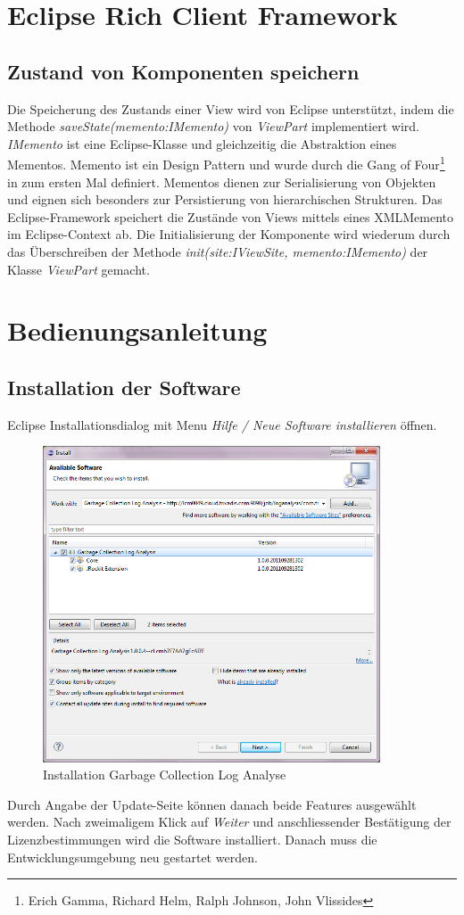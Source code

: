 \chapter{Eclipse Rich Client Framework}
\section{Zustand von Komponenten speichern}\label{memento}
Die Speicherung des Zustands einer View wird von Eclipse unterstützt, indem die Methode \textit{saveState(memento:IMemento)} von \textit{ViewPart} implementiert wird. \textit{IMemento} ist eine Eclipse-Klasse und gleichzeitig die Abstraktion eines Mementos. Memento ist ein Design Pattern und wurde durch die Gang of Four\footnote{Erich Gamma, Richard Helm, Ralph Johnson, John Vlissides} in \cite[S. 283]{gamma1995design} zum ersten Mal definiert. Mementos dienen zur Serialisierung von Objekten und eignen sich besonders zur Persistierung von hierarchischen Strukturen. Das Eclipse-Framework speichert die Zustände von Views mittels eines XMLMemento im Eclipse-Context ab. Die Initialisierung der Komponente wird wiederum durch das Überschreiben der Methode \textit{init(site:IViewSite, memento:IMemento)} der Klasse \textit{ViewPart} gemacht.

\chapter{Bedienungsanleitung}\label{bedienungsanleitung}
\section{Installation der Software}
Eclipse Installationsdialog mit Menu \textit{Hilfe / Neue Software installieren} öffnen.
 \begin{figure}[H]
  	\centering
    	\includegraphics[width=10cm]{images/tutorial_install01}
        	\caption{Installation Garbage Collection Log Analyse}
\end{figure}
Durch Angabe der Update-Seite können danach beide Features ausgewählt werden. Nach zweimaligem Klick auf \textit{Weiter} und anschliessender Bestätigung der Lizenzbestimmungen wird die Software installiert. Danach muss die Entwicklungsumgebung neu gestartet werden.


